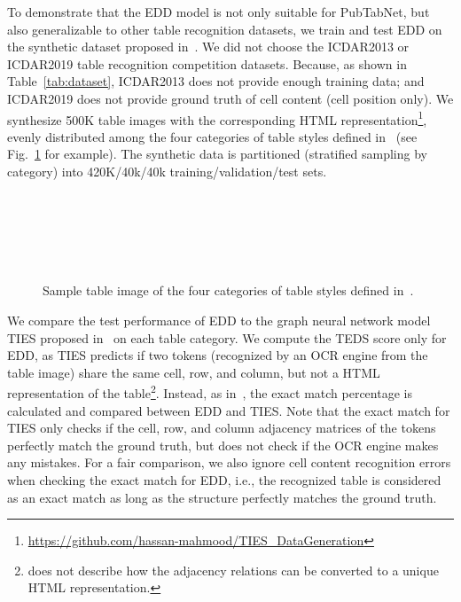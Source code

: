 \documentclass[conference]{IEEEtran}
\begin{document}
To demonstrate that the EDD model is not only suitable for PubTabNet, but also
generalizable to other table recognition datasets, we train and test EDD on the
synthetic dataset proposed in~\cite{qasim2019rethinking}. We did not choose the
ICDAR2013 or ICDAR2019 table recognition competition datasets. Because, as shown
in Table~\ref{tab:dataset}, ICDAR2013 does not provide enough training data; and
ICDAR2019 does not provide ground truth of cell content (cell position only). We
synthesize 500K table images with the corresponding HTML
representation\footnote{\url{https://github.com/hassan-mahmood/TIES\_DataGeneration}},
evenly distributed among the four categories of table styles defined
in~\cite{qasim2019rethinking} (see Fig.~\ref{fig:style} for
example). The synthetic data is partitioned (stratified sampling by category)
into 420K/40k/40k training/validation/test sets.

\begin{figure}[!ht]
  \centering
  \begin{minipage}[b]{\linewidth}\end{minipage}\\
  \begin{minipage}[b]{\linewidth}\end{minipage}\\
  \begin{minipage}[b]{\linewidth}\end{minipage}\\
  \begin{minipage}[b]{\linewidth}\end{minipage}
  \caption{Sample table image of the four categories of table styles defined in~\cite{qasim2019rethinking}.}
  \label{fig:style}
\end{figure}

We compare the test performance of EDD to the graph neural network model TIES
proposed in~\cite{qasim2019rethinking} on each table category. We compute the
TEDS score only for EDD, as TIES predicts if two tokens (recognized by an OCR
engine from the table image) share the same cell, row, and column, but not a
HTML representation of the table\footnote{\cite{qasim2019rethinking} does not
describe how the adjacency relations can be converted to a unique HTML
representation.}. Instead, as in~\cite{qasim2019rethinking}, the exact match
percentage is calculated and compared between EDD and TIES. Note that the exact
match for TIES only checks if the cell, row, and column adjacency matrices of
the tokens perfectly match the ground truth, but does not check if the OCR
engine makes any mistakes. For a fair comparison, we also ignore cell content
recognition errors when checking the exact match for EDD, i.e., the recognized
table is considered as an exact match as long as the structure perfectly matches
the ground truth.
\end{document}
